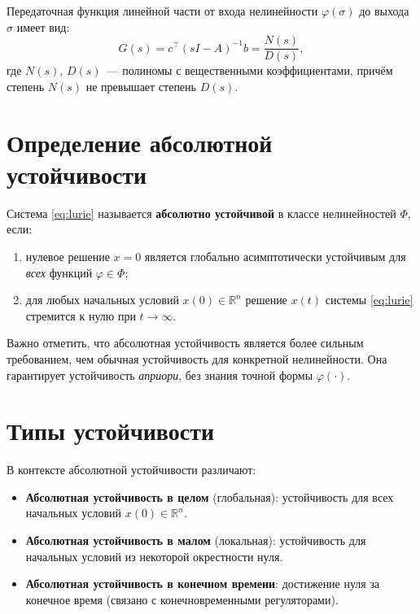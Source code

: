 Передаточная функция линейной части от входа нелинейности $\varphi(\sigma)$ до выхода $\sigma$ имеет вид:
\begin{equation}
    G(s) = c^\top (sI - A)^{-1} b = \frac{N(s)}{D(s)},
\end{equation}
где $N(s)$, $D(s)$~--- полиномы с вещественными коэффициентами, причём степень $N(s)$ не превышает степень $D(s)$.

\section{Определение абсолютной устойчивости}

\begin{definition}
Система \eqref{eq:lurie} называется \textbf{абсолютно устойчивой} в классе нелинейностей $\Phi$, если:
\begin{enumerate}
    \item нулевое решение $x=0$ является глобально асимптотически устойчивым для \emph{всех} функций $\varphi\in\Phi$;
    \item для любых начальных условий $x(0)\in\mathbb{R}^n$ решение $x(t)$ системы \eqref{eq:lurie} стремится к нулю при $t\to\infty$.
\end{enumerate}
\end{definition}

Важно отметить, что абсолютная устойчивость является более сильным требованием, чем обычная устойчивость для конкретной нелинейности. Она гарантирует устойчивость \emph{априори}, без знания точной формы $\varphi(\cdot)$.

\section{Типы устойчивости}

В контексте абсолютной устойчивости различают:
\begin{itemize}
    \item \textbf{Абсолютная устойчивость в целом} (глобальная): устойчивость для всех начальных условий $x(0)\in\mathbb{R}^n$.
    \item \textbf{Абсолютная устойчивость в малом} (локальная): устойчивость для начальных условий из некоторой окрестности нуля.
    \item \textbf{Абсолютная устойчивость в конечном времени}: достижение нуля за конечное время (связано с конечновременными регуляторами).
\end{itemize}

